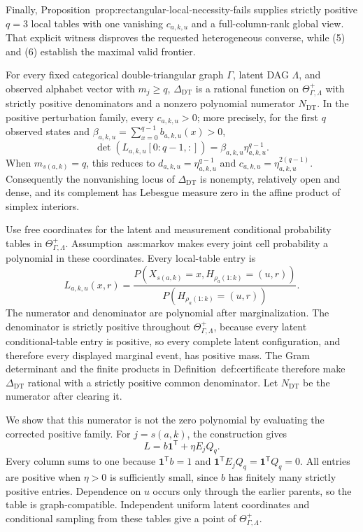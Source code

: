 Finally, Proposition~\textnormal{prop:rectangular-local-necessity-fails} supplies strictly positive \(q=3\) local tables with one vanishing \(c_{a,k,u}\) and a full-column-rank global view.  That explicit witness disproves the requested heterogeneous converse, while (5) and (6) establish the maximal valid frontier.

For every fixed categorical double-triangular graph \(\Gamma\), latent DAG \(\Lambda\), and observed alphabet vector with \(m_j\ge q\), \(\Delta_{\mathrm{DT}}\) is a rational function on \(\Theta_{\Gamma,\Lambda}^{+}\) with strictly positive denominators and a nonzero polynomial numerator \(N_{\mathrm{DT}}\).  In the positive perturbation family, every \(c_{a,k,u}>0\); more precisely, for the first \(q\) observed states and \(\beta_{a,k,u}=\sum_{x=0}^{q-1}b_{a,k,u}(x)>0\),
\[
 \det(L_{a,k,u}[0{:}q-1,:])
 =\beta_{a,k,u}\eta_{a,k,u}^{q-1}.
\]
When \(m_{s(a,k)}=q\), this reduces to \(d_{a,k,u}=\eta_{a,k,u}^{q-1}\) and \(c_{a,k,u}=\eta_{a,k,u}^{2(q-1)}\).  Consequently the nonvanishing locus of \(\Delta_{\mathrm{DT}}\) is nonempty, relatively open and dense, and its complement has Lebesgue measure zero in the affine product of simplex interiors.

Use free coordinates for the latent and measurement conditional probability tables in \(\Theta_{\Gamma,\Lambda}^{+}\).  Assumption~\textnormal{ass:markov} makes every joint cell probability a polynomial in these coordinates.  Every local-table entry is
\[
 L_{a,k,u}(x,r)
 =\frac{P(X_{s(a,k)}=x,
 H_{\rho_a(1:k)}=(u,r))}
 {P(H_{\rho_a(1:k)}=(u,r))}.
\tag{7}
\]
The numerator and denominator are polynomial after marginalization.  The denominator is strictly positive throughout \(\Theta_{\Gamma,\Lambda}^{+}\), because every latent conditional-table entry is positive, so every complete latent configuration, and therefore every displayed marginal event, has positive mass.  The Gram determinant and the finite products in Definition~\textnormal{def:certificate} therefore make \(\Delta_{\mathrm{DT}}\) rational with a strictly positive common denominator.  Let \(N_{\mathrm{DT}}\) be the numerator after clearing it.

We show that this numerator is not the zero polynomial by evaluating the corrected positive family.  For \(j=s(a,k)\), the construction gives
\[
 L=b\mathbf1^{\mathsf T}+\eta E_jQ_q.
\]
Every column sums to one because \(\mathbf1^{\mathsf T}b=1\) and \(\mathbf1^{\mathsf T}E_jQ_q=\mathbf1^{\mathsf T}Q_q=0\).  All entries are positive when \(\eta>0\) is sufficiently small, since \(b\) has finitely many strictly positive entries.  Dependence on \(u\) occurs only through the earlier parents, so the table is graph-compatible.  Independent uniform latent coordinates and conditional sampling from these tables give a point of \(\Theta_{\Gamma,\Lambda}^{+}\).

